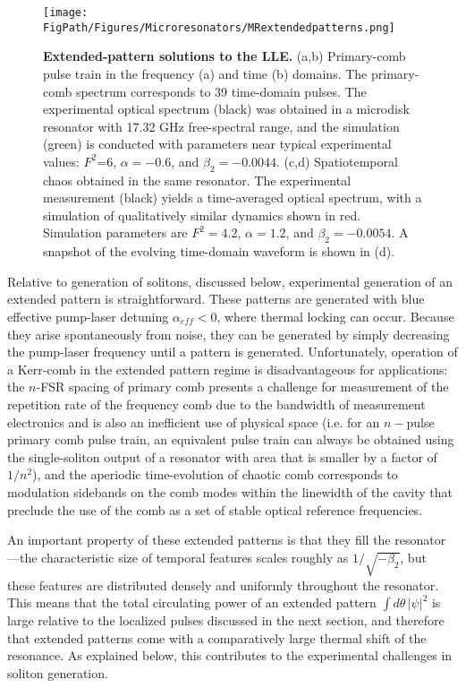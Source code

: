 \begin{figure}[htpb]
	\begin{center}
		\texttt{[image: \\FigPath/Figures/Microresonators/MRextendedpatterns.png]}
	\end{center}
	\caption[Extended-pattern solutions to the LLE]{\textbf{Extended-pattern solutions to the LLE.} (a,b) Primary-comb pulse train in the frequency (a) and time (b) domains. The primary-comb spectrum corresponds to 39 time-domain pulses. The experimental optical spectrum (black) was obtained in a microdisk resonator with 17.32 GHz free-spectral range, and the simulation (green) is conducted with parameters near typical experimental values: $F^2$=6, $\alpha=-0.6$, and $\beta_2=-0.0044$. (c,d) Spatiotemporal chaos obtained in the same resonator. The experimental measurement (black) yields a time-averaged optical spectrum, with a simulation of qualitatively similar dynamics shown in red. Simulation parameters are $F^2=4.2$, $\alpha=1.2$, and $\beta_2=-0.0054$. A snapshot of the evolving time-domain waveform is shown in (d).
	}
	
	\label{fig:MRextendedpatterns}
\end{figure} 

Relative to generation of solitons, discussed below, experimental generation of an extended pattern is straightforward. These patterns are generated with blue effective pump-laser detuning $\alpha_{eff}<0$, where thermal locking can occur. Because they arise spontaneously from noise, they can be generated by simply decreasing the pump-laser frequency until a pattern is generated. Unfortunately, operation of a Kerr-comb in the extended pattern regime is disadvantageous for applications: the $n$-FSR spacing of primary comb presents a challenge for measurement of the repetition rate of the frequency comb due to the bandwidth of measurement electronics and is also an inefficient use of physical space (i.e. for an $n-$pulse primary comb pulse train, an equivalent pulse train can always be obtained using the single-soliton output of a resonator with area that is smaller by a factor of $1/n^2$), and the aperiodic time-evolution of chaotic comb corresponds to modulation sidebands on the comb modes within the linewidth of the cavity that preclude the use of the comb as a set of stable optical reference frequencies. 

An important property of these extended patterns is that they fill the resonator---the characteristic size of temporal features scales roughly as $1/\sqrt{-\beta_2}$, but these features are distributed densely and uniformly throughout the resonator. This means that the total circulating power of an extended pattern $\int d\theta\, |\psi|^2$ is large relative to the localized pulses discussed in the next section, and therefore that extended patterns come with a comparatively large thermal shift of the resonance. As explained below, this contributes to the experimental challenges in soliton generation.



